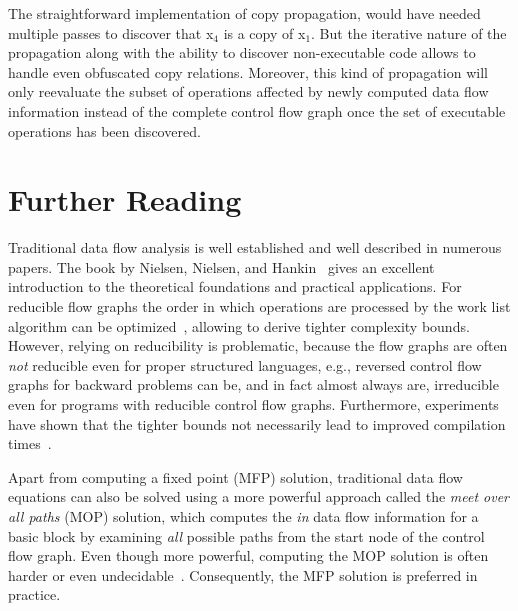 The straightforward implementation of copy propagation, would have needed
multiple passes to discover that x$_4$ is a copy of x$_1$.  But the iterative
nature of the propagation along with the ability to discover non-executable
code allows to handle even obfuscated copy relations. Moreover, this kind of
propagation will only reevaluate the subset of operations affected by newly
computed data flow information instead of the complete control flow graph once
the set of executable operations has been discovered.

\section{Further Reading}
\label{novillo:sec:further_reading}


Traditional data flow analysis is well established and well described in
numerous papers. The book by Nielsen, Nielsen, and
Hankin~\cite{novillo:bib:NNH99} gives an excellent introduction to the
theoretical foundations and practical applications.
For reducible flow graphs the order in which operations are processed by the
work list algorithm can be
optimized~\cite{novillo:bib:HU73,novillo:bib:KU76,novillo:bib:NNH99}, allowing
to derive tighter complexity bounds. However, relying on reducibility is
problematic, because the flow graphs are often \emph{not} reducible even for
proper structured languages, e.g., reversed control flow graphs for backward
problems can be, and in fact almost always are, irreducible even for programs
with reducible control flow graphs. Furthermore, experiments have shown that the
tighter bounds not necessarily lead to improved compilation
times~\cite{novillo:bib:CTK06}.

Apart from computing a fixed point (MFP) solution, traditional data flow
equations can also
be solved using a more powerful approach called the \emph{meet over all paths}
(MOP) solution, which computes the \emph{in} data flow information for a basic
block by examining \emph{all} possible paths from the start node of the control
flow graph. Even though more powerful, computing the MOP solution is often
harder or even undecidable~\cite{novillo:bib:NNH99}. Consequently,
the MFP solution is preferred in practice.

